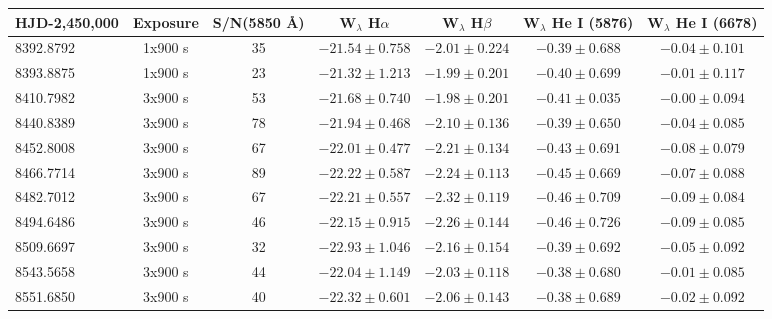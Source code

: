 \documentclass[]{aastex631}
\begin{document}
\begin{table*}

    \centering
    \begin{tabular}{lcccccc}
        \hline
       HJD-2,450,000 & Exposure & S/N(5850 \AA) &  W$_{\lambda}$ H$\alpha$ & W$_{\lambda}$ H$\beta$ & W$_{\lambda}$ He I (5876) & W$_{\lambda}$ He I (6678) \\ 
       \hline
         8392.8792 & 1x900 s& 35  & $-21.54 \pm 0.758$ & $-2.01 \pm 0.224$ & $-0.39 \pm 0.688$ & $-0.04 \pm 0.101$ \\
         
         8393.8875 & 1x900 s& 23  & $-21.32 \pm 1.213$ & $-1.99 \pm 0.201$  & $-0.40 \pm 0.699$ & $-0.01 \pm 0.117$\\  
         
         8410.7982 & 3x900 s& 53 & $-21.68 \pm 0.740$ & $-1.98 \pm 0.201$ & $-0.41 \pm 0.035$ & $-0.00 \pm 0.094$\\ 
         
         8440.8389 & 3x900 s& 78  & $-21.94 \pm 0.468$ & $-2.10 \pm 0.136$ & $-0.39 \pm 0.650$ & $-0.04 \pm 0.085$ \\ 
         
         8452.8008 & 3x900 s& 67 & $-22.01 \pm 0.477$ & $-2.21 \pm 0.134$ & $-0.43 \pm 0.691$ & $-0.08 \pm 0.079$\\ 
         
         8466.7714 & 3x900 s& 89  & $-22.22 \pm 0.587$ & $-2.24 \pm 0.113 $ & $-0.45 \pm 0.669$ & $-0.07 \pm 0.088$ \\ 
         
         8482.7012 & 3x900 s& 67  & $-22.21 \pm 0.557$ & $-2.32 \pm 0.119$ & $-0.46 \pm 0.709$ & $-0.09 \pm 0.084$ \\ 
         
         8494.6486 & 3x900 s& 46 & $-22.15 \pm 0.915$ & $-2.26 \pm 0.144$ & $-0.46 \pm 0.726$ & $-0.09 \pm 0.085$	\\ 
         
         8509.6697 & 3x900 s& 32  & $-22.93 \pm 1.046$ & $-2.16 \pm 0.154$ & $-0.39 \pm 0.692$ & $-0.05 \pm 0.092$ \\ 
         
         8543.5658 & 3x900 s& 44  & $-22.04 \pm 1.149$ & $-2.03 \pm 0.118$ & $-0.38 \pm 0.680$ & $-0.01 \pm 0.085$ \\ 
         
         8551.6850 & 3x900 s& 40  & $-22.32 \pm 0.601$ & $-2.06 \pm 0.143$ & $-0.38 \pm 0.689$ & $-0.02 \pm 0.092$ \\ 
         

\end{tabular}
\end{table*}
\end{document}
